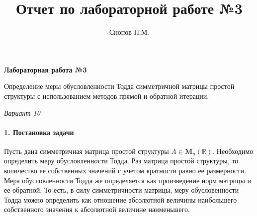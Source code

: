 \documentclass[11pt,a4paper]{report}
\begin{document}
	
\lstset{ 
	language=Python, 
	tabsize=2, 
	showspaces=false, 
	showstringspaces=false, 
	float=[htb], 
	captionpos=b, 
	basicstyle=\footnotesize,
	numberblanklines=false, 
} 



\title{Отчет по лабораторной работе №3}

\author{Снопов П.М.}
\thispagestyle{titlepagestyle}
\maketitle
\begin{center}
	\textbf{Лабораторная работа №3}
	
	Определение меры обусловленности Тодда симметричной матрицы простой структуры с использованием методов прямой и обратной итерации. 
	
	\textit{Вариант 10}
\end{center}

\paragraph{1. Постановка задачи}
Пусть дана симметричная матрица простой структуры $A \in \boldsymbol{M}_{n}(\mathbb{R}) $. Необходимо определить меру обусловленности Тодда. Раз матрица простой структуры, то количество ее собственных значений с учетом кратности равно ее размерности. Мера обусловленности Тодда же определяется как произведение норм матрицы и ее обратной. То есть, в силу симметричности матрицы, меру обусловенности Тодда можно определить как отношение абсолютной величины наибольшего собственного значения к абсолютной величине наименьшего.
\end{document}
